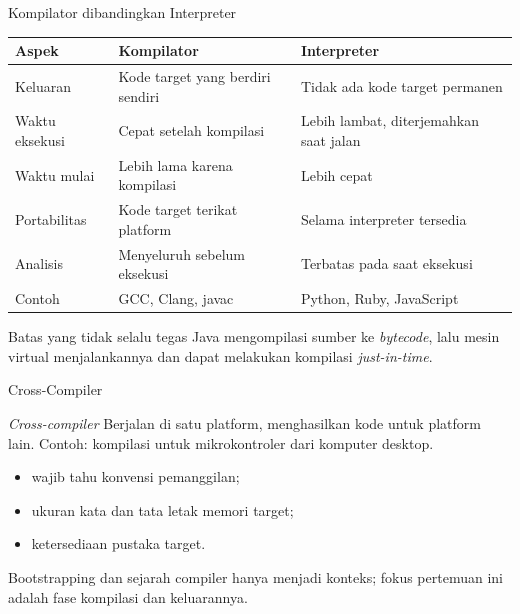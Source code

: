 \documentclass[aspectratio=169,10pt,t]{beamer}
\begin{document}
\begin{frame}{Kompilator dibandingkan Interpreter}
  \small
  \begin{tabular}{@{}p{3.1cm}p{5.2cm}p{5.2cm}@{}}
    \toprule
    \textbf{Aspek} & \textbf{Kompilator} & \textbf{Interpreter} \\
    \midrule
    Keluaran & Kode target yang berdiri sendiri & Tidak ada kode target permanen \\
    Waktu eksekusi & Cepat setelah kompilasi & Lebih lambat, diterjemahkan saat jalan \\
    Waktu mulai & Lebih lama karena kompilasi & Lebih cepat \\
    Portabilitas & Kode target terikat platform & Selama interpreter tersedia \\
    Analisis & Menyeluruh sebelum eksekusi & Terbatas pada saat eksekusi \\
    Contoh & GCC, Clang, javac & Python, Ruby, JavaScript \\
    \bottomrule
  \end{tabular}

  \vspace{5pt}
  \begin{exampleblock}{Batas yang tidak selalu tegas}
    Java mengompilasi sumber ke \textit{bytecode}, lalu mesin virtual
    menjalankannya dan dapat melakukan kompilasi \textit{just-in-time}.
  \end{exampleblock}
\end{frame}

\begin{frame}{Cross-Compiler}
  \begin{block}{\textit{Cross-compiler}}
    \footnotesize
    Berjalan di satu platform, menghasilkan kode untuk platform lain.
    Contoh: kompilasi untuk mikrokontroler dari komputer desktop.
    \begin{itemize}
      \item wajib tahu konvensi pemanggilan;
      \item ukuran kata dan tata letak memori target;
      \item ketersediaan pustaka target.
    \end{itemize}
  \end{block}

  \vspace{4pt}
  {\footnotesize\color{ubbblue!80}Bootstrapping dan sejarah compiler
  hanya menjadi konteks; fokus pertemuan ini adalah fase kompilasi
  dan keluarannya.}
\end{frame}
\end{document}
